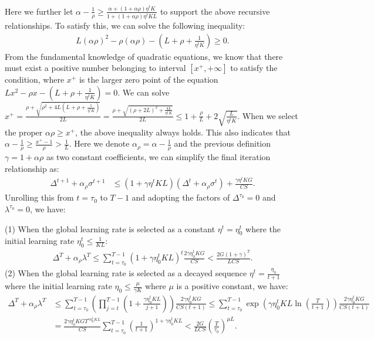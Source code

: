 Here we further let $\alpha - \frac{1}{\rho} \geq \frac{\alpha + (1 + \alpha\rho)\eta^t K}{1 + (1 + \alpha\rho)\eta^t KL}$ to support the above recursive relationships. To satisfy this, we can solve the following inequality:
\begin{align*}
    L(\alpha\rho)^2 - \rho(\alpha\rho) - \left(L + \rho + \frac{1}{\eta^t K}\right) \geq 0.
\end{align*}
From the fundamental knowledge of quadratic equations, we know that there must exist a positive number belonging to interval $\left[x^+, +\infty \right]$ to satisfy the condition, where $x^+$ is the larger zero point of the equation $Lx^2 - \rho x - \left(L + \rho + \frac{1}{\eta^t K}\right) = 0$. We can solve $x^+ = \frac{\rho + \sqrt{\rho^2 + 4L(L + \rho + \frac{1}{\eta^t K})}}{2L} = \frac{\rho + \sqrt{(\rho + 2L)^2 + \frac{4L}{\eta^t K}}}{2L} \leq 1 + \frac{\rho}{L} + 2\sqrt{\frac{L}{\eta^t K}}$. When we select the proper $\alpha\rho \geq x^+$, the above inequality always holds. This also indicates that $\alpha-\frac{1}{\rho}\geq \frac{x^+-1}{\rho}> \frac{1}{L}$. Here we denote $\alpha_\rho=\alpha-\frac{1}{\rho}$ and the previous definition $\gamma = 1 + \alpha\rho$ as two constant coefficients, we can simplify the final iteration relationship as:
\begin{align*}
    \Delta^{t+1} + \alpha_\rho\sigma^{t+1} 
    &\leq \left(1 + \gamma\eta^t KL\right)\left(\Delta^t + \alpha_\rho \sigma^t\right) +  \frac{\gamma\eta^t KG}{CS}.
\end{align*}
Unrolling this from $t=\tau_0$ to $T-1$ and adopting the factors of $\Delta^{\tau_0}=0$ and $\lambda^{\tau_0}=0$,
we have:

(1) When the global learning rate is selected as a constant $\eta^t=\eta^t_0$ where the initial learning rate $\eta^t_0\leq \frac{1}{KL}$:
\begin{align*}
    \Delta^{T} + \alpha_\rho\lambda^{T} \leq \sum_{t=\tau_0}^{T-1}\left(1 + \gamma\eta^t_0 KL\right)^t\frac{2\gamma\eta^t_0 KG}{CS} < \frac{2G\left(1 + \gamma\right)^{T}}{LCS}.
\end{align*}
(2) When the global learning rate is selected as a decayed sequence $\eta^t=\frac{\eta_0}{t+1}$ where the initial learning rate $\eta_0\leq \frac{\mu}{\gamma K}$ where $\mu$ is a positive constant, we have:
\begin{align*}
    \Delta^{T} + \alpha_\rho\lambda^{T} 
    &\leq \sum_{t=\tau_0}^{T-1}\left(\prod_{j=t}^{T-1}\left(1 + \frac{\gamma\eta^t_0 KL}{j+1}\right)\right)\frac{2\gamma\eta^t_0 KG}{CS(t+1)} \leq \sum_{t=\tau_0}^{T-1}\exp\left(\gamma\eta^t_0 KL\ln\left(\frac{T}{t+1}\right)\right)\frac{2\gamma\eta^t_0 KG}{CS(t+1)}\\
    &= \frac{2\gamma\eta^t_0 KG T^{\gamma\eta^t_0 KL}}{CS}\sum_{t=\tau_0}^{T-1}\left(\frac{1}{t+1}\right)^{1+\gamma\eta^t_0 KL} < \frac{2G}{LCS}\left(\frac{T}{\tau_0}\right)^{\mu L}.
\end{align*}

